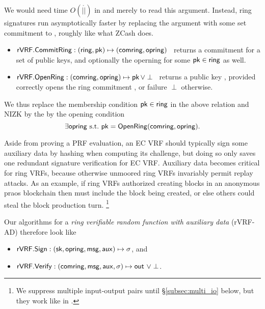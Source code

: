 We would need time $O(|\ring|)$ in \rSign and \rVerify merely to read
this \ring argument.  Instead, ring signatures run asymptotically faster
by replacing the \ring argument with some set commitment to \ring,
roughly like what ZCash does.
\begin{itemize}
\item ${\mathsf{rVRF}}.{\mathsf{CommitRing}} : (\mathsf{ring},\mathsf{pk}) \mapsto (\mathsf{comring},\mathsf{opring})$ \,
    returns a commitment for a set \ring of public keys, and
    optionally the operning \openring for some $\mathsf{pk} \in \mathsf{ring}$ as well.
\item ${\mathsf{rVRF}}.{\mathsf{OpenRing}} : (\mathsf{comring},\mathsf{opring}) \mapsto \mathsf{pk} \, \lor \perp$ \,
    returns a public key \pk, provided \openring correctly opens
    the ring commitment \comring, or failure $\perp$ otherwise.
\end{itemize}

We thus replace the membership condition $\mathsf{pk} \in \mathsf{ring}$ in the above
relation and NIZK by the by the opening condition
$$ \exists \mathsf{opring} \textrm{\ s.t.\ } \mathsf{pk} = {\mathsf{OpenRing}}(\mathsf{comring},\mathsf{opring}) . $$
%


Aside from proving a PRF evaluation, an EC VRF should typically sign
some auxiliary data \aux by hashing \aux when computing its challenge,
but doing so only saves one redundant signature verification for EC VRF.
Auxiliary data becomes critical for ring VRFs, because otherwise
unmoored ring VRFs invariably permit replay attacks.
As an example, if ring VRFs authorized creating blocks in an anonymous
praos \cite{praos} blockchain then \aux must include the block being
created, or else others could steal the block production turn.%
\footnote{We suppress multiple input-output pairs until \S\ref{subsec:multi_io} below, but they work like in \cite{PrivacyPass}.}

Our algorithms for a {\em ring verifiable random function with auxiliary data} (rVRF-AD) therefore look like
\begin{itemize}
\item ${\mathsf{rVRF}}.{\mathsf{Sign}} : (\mathsf{sk},\mathsf{opring},\mathsf{msg},\mathsf{aux}) \mapsto \sigma$, \quad and
\item ${\mathsf{rVRF}}.{\mathsf{Verify}} : (\mathsf{comring},\mathsf{msg},\mathsf{aux},\sigma) \mapsto {\ensuremath{\mathsf{out}}} \,\, \lor \perp$.
\end{itemize}

